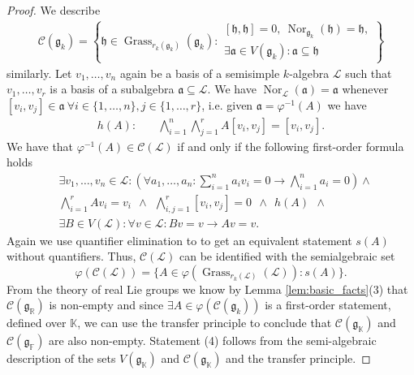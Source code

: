 \documentclass[12pt]{amsart}
\newcommand{\F}{\mathbb{F} }
\newcommand{\R}{\mathbb{R} }
\newcommand{\K}{\mathbb{K}}
\newcommand{\frakg}{\mathfrak{g}}
\newcommand{\fraka}{\mathfrak{a}}
\newcommand{\frakh}{\mathfrak{h}}
\newcommand{\eL}{\mathcal{L}}
\numberwithin{equation}{section}
\theoremstyle{remark} %
\begin{document}
\begin{proof}
	We describe 
	\begin{align*}
		\mathcal{C}(\frakg_k) = \left\{ \frakh \in \operatorname{Grass}_{r_{k}(\frakg_k)}(\frakg_k) \colon 
		\begin{matrix}
			[\frakh , \frakh] = 0 , \ \operatorname{Nor}_{\frakg_k}(\frakh) = \frakh, \\%
			\exists \fraka \in V(\frakg_k) \colon \fraka \subseteq \frakh 
		\end{matrix}
		\right\}
	\end{align*}
	similarly. Let $v_1, \ldots , v_n$ again be a basis of a semisimple $k$-algebra $\eL$ such that $v_1 , \ldots , v_r$ is a basis of a subalgebra $\fraka \subseteq \eL$. We have $\operatorname{Nor}_{\eL}(\fraka) = \fraka$ whenever $[v_i,v_j] \in \fraka \ \forall i \in \{1, \ldots , n\}, j \in \{1, \ldots , r\}$, i.e. given $\fraka = \varphi^{-1}(A)$ we have
	\begin{align*}
		h(A) \colon \quad &
		\bigwedge_{i=1}^n \bigwedge_{j=1}^r A[v_i , v_j] = [v_i,v_j].
	\end{align*}
	We have that $\varphi^{-1}(A) \in \mathcal{C}(\eL)$ if and only if the following first-order formula holds
	\begin{align*}
		& \exists v_1, \ldots , v_n \in \eL \colon \left( \forall a_1 , \ldots ,a_n \colon \sum_{i=1}^n a_i v_i = 0 \to \bigwedge_{i=1}^n  a_i = 0 \right) \wedge\\
		& \bigwedge_{i=1}^r Av_i = v_i \ \ \wedge\ \  %
		\bigwedge_{i,j=1}^r [v_i,v_j] = 0   \ \ \wedge \ \ h(A) \ \ \wedge \\
		&  \exists  B \in V(\eL) \colon \forall v \in \eL \colon Bv=v \to Av = v. 
	\end{align*}
	Again we use quantifier elimination to to get an equivalent statement $s(A)$ without quantifiers. Thus, $\mathcal{C}(\eL)$ can be identified with the semialgebraic set
	$$
	\varphi(\mathcal{C}(\eL)) = \{ A  \in \varphi(\operatorname{Grass}_{r_k(\eL)} (\eL)) \colon s(A)\}.
	$$
	From the theory of real Lie groups we know by Lemma \ref{lem:basic_facts}(3) that $\mathcal{C}(\frakg_{\R})$ is non-empty and since $\exists A \in \varphi(\mathcal{C}(\frakg_k))$ is a first-order statement, defined over $\K$, we can use the transfer principle to conclude that $\mathcal{C}(\frakg_\K)$ and $\mathcal{C}(\frakg_{\F})$ are also non-empty. Statement (4) follows from the semi-algebraic description of the sets $V(\frakg_\K)$ and $\mathcal{C}(\frakg_\K)$ and the transfer principle.
	

\end{proof}
\end{document}
